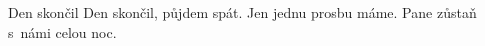 \begin{TEXT}{Den skončil}
\SLOKA* [A.] Den skončil, půjdem spát. 
\SLOKA* [B.] Jen jednu prosbu máme. 
\SLOKA* [C.] Pane zůstaň s námi celou noc.
\end{TEXT}
